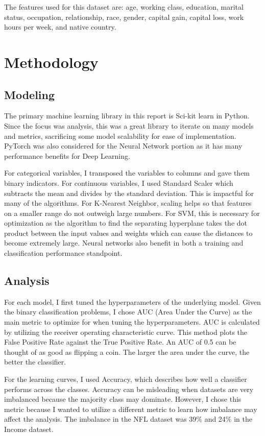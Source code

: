 \documentclass[12pt]{article}
\begin{document}
The features used for this dataset are: age, working class, education, marital status, occupation, relationship, race, gender, capital gain, capital loss, work hours per week, and native country.

\section{Methodology}
\subsection*{Modeling}
The primary machine learning library in this report is Sci-kit learn in Python. Since the focus was analysis, this was a great library to iterate on many models and metrics, sacrificing some model scalability for ease of implementation. PyTorch was also considered for the Neural Network portion as it has many performance benefits for Deep Learning.

For categorical variables, I transposed the variables to columns and gave them binary indicators. For continuous variables, I used Standard Scaler which subtracts the mean and divides by the standard deviation. This is impactful for many of the algorithms. For K-Nearest Neighbor, scaling helps so that features on a smaller range do not outweigh large numbers.  For SVM, this is necessary for optimization as the algorithm to find the separating hyperplane takes the dot product between the input values and weights which can cause the distances to become extremely large. Neural networks also benefit in both a training and classification performance standpoint.

\subsection*{Analysis}
For each model, I first tuned the hyperparameters of the underlying model.  Given the binary classification problems, I chose AUC (Area Under the Curve) as the main metric to optimize for when tuning the hyperparameters.  AUC is calculated by utilizing the receiver operating characteristic curve. This method plots the False Positive Rate against the True Positive Rate. An AUC of 0.5 can be thought of as good as flipping a coin. The larger the area under the curve, the better the classifier.

For the learning curves, I used Accuracy, which describes how well a classifier performs across the classes. Accuracy can be misleading when datasets are very imbalanced because the majority class may dominate. However, I chose this metric because I wanted to utilize a different metric to learn how imbalance may affect the analysis. The imbalance in the NFL dataset was 39\% and 24\% in the Income dataset.
\end{document}
